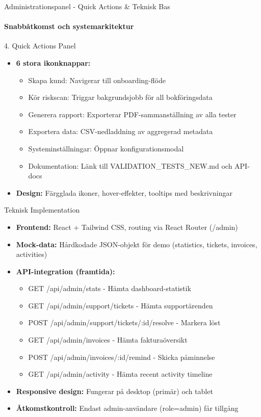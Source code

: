 \documentclass[10pt]{beamer}
\begin{document}
\begin{frame}{Administrationspanel - Quick Actions \& Teknisk Bas}
\framesubtitle{Snabbåtkomst och systemarkitektur}

\begin{block}{4. Quick Actions Panel}
  \begin{itemize}
    \item \textbf{6 stora ikonknappar:}
      \begin{itemize}
        \item Skapa kund: Navigerar till onboarding-flöde
        \item Kör riskscan: Triggar bakgrundsjobb för all bokföringsdata
        \item Generera rapport: Exporterar PDF-sammanställning av alla tester
        \item Exportera data: CSV-nedladdning av aggregerad metadata
        \item Systeminställningar: Öppnar konfigurationsmodal
        \item Dokumentation: Länk till VALIDATION\_TESTS\_NEW.md och API-docs
      \end{itemize}
    \item \textbf{Design:} Färgglada ikoner, hover-effekter, tooltips med beskrivningar
  \end{itemize}
\end{block}

\begin{block}{Teknisk Implementation}
  \begin{itemize}
    \item \textbf{Frontend:} React + Tailwind CSS, routing via React Router (/admin)
    \item \textbf{Mock-data:} Hårdkodade JSON-objekt för demo (statistics, tickets, invoices, activities)
    \item \textbf{API-integration (framtida):}
      \begin{itemize}
        \item GET /api/admin/stats - Hämta dashboard-statistik
        \item GET /api/admin/support/tickets - Hämta supportärenden
        \item POST /api/admin/support/tickets/:id/resolve - Markera löst
        \item GET /api/admin/invoices - Hämta fakturaöversikt
        \item POST /api/admin/invoices/:id/remind - Skicka påminnelse
        \item GET /api/admin/activity - Hämta recent activity timeline
      \end{itemize}
    \item \textbf{Responsive design:} Fungerar på desktop (primär) och tablet
    \item \textbf{Åtkomstkontroll:} Endast admin-användare (role=admin) får tillgång
  \end{itemize}
\end{block}


\end{frame}
\end{document}
